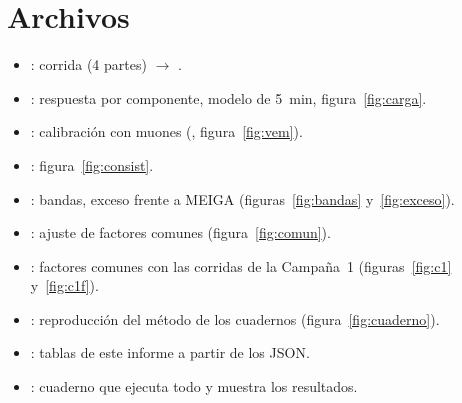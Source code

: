 \documentclass[11pt,a4paper]{article}
\begin{document}
\section*{Archivos}
\begin{itemize}
\item {}: corrida (4 partes) $\to$ .
\item {}: respuesta por componente, modelo de 5~min, figura~\ref{fig:carga}.
\item {}: calibración con muones (, figura~\ref{fig:vem}).
\item {}: figura~\ref{fig:consist}.
\item {}: bandas, exceso frente a MEIGA (figuras~\ref{fig:bandas} y~\ref{fig:exceso}).
\item {}: ajuste de factores comunes (figura~\ref{fig:comun}).
\item {}: factores comunes con las corridas de la Campaña~1 (figuras~\ref{fig:c1} y~\ref{fig:c1f}).
\item {}: reproducción del método de los cuadernos (figura~\ref{fig:cuaderno}).
\item {}: tablas de este informe a partir de los JSON.
\item {}: cuaderno que ejecuta todo y muestra los resultados.
\end{itemize}
\end{document}
